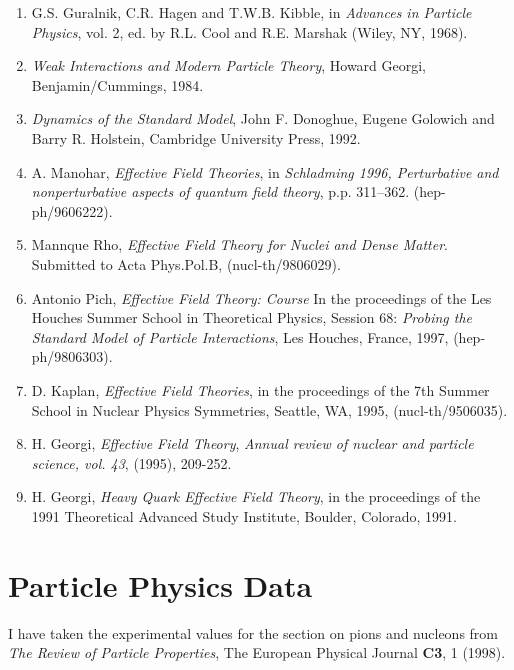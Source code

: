 \documentclass[12pt,epsf]{report}
\begin{document}
\begin{enumerate}

\item
G.S. Guralnik, C.R. Hagen and T.W.B. Kibble, in {\it
Advances in Particle Physics}, vol. 2, ed. by R.L. Cool and
R.E. Marshak (Wiley, NY, 1968).

\item
{\it Weak Interactions and Modern Particle Theory}, Howard
Georgi, Benjamin/Cummings, 1984.

\item
{\it Dynamics of the Standard Model}, John F. Donoghue,
Eugene Golowich and Barry R. Holstein, Cambridge University
Press, 1992.

\item
A. Manohar, {\sl Effective Field Theories},  in {\it
Schladming 1996, Perturbative and nonperturbative  aspects
of quantum field theory}, p.p. 311--362. (hep-ph/9606222).

\item
Mannque Rho, {\sl Effective Field Theory for Nuclei and
Dense Matter}. Submitted to Acta Phys.Pol.B,
(nucl-th/9806029).

\item
Antonio Pich, {\sl Effective Field Theory: Course} In the
proceedings of the Les Houches Summer School in Theoretical
Physics, Session 68: {\it Probing the Standard Model of
Particle Interactions}, Les Houches, France, 1997,
(hep-ph/9806303).

\item
D. Kaplan, {\sl Effective Field Theories}, in the
proceedings of the 7th Summer School in Nuclear Physics
Symmetries, Seattle, WA, 1995, (nucl-th/9506035).

\item
H. Georgi, {\sl Effective Field Theory}, {\it Annual review
of nuclear and particle science, vol. 43}, (1995), 209-252.

\item
H. Georgi, {\sl Heavy Quark Effective Field Theory}, in the
proceedings of the 1991 Theoretical Advanced Study
Institute, Boulder, Colorado, 1991. 

\end{enumerate}

\section{Particle Physics Data}

I have taken the experimental values for the section on
pions and nucleons from {\it The Review of Particle
Properties}, The European Physical Journal {\bf C3},
1 (1998).
\end{document}
